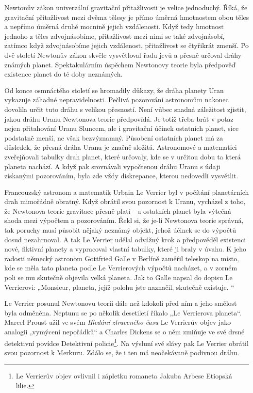   Newtonův zákon univerzální gravitační přitažlivosti je velice jednoduchý. Říká, že gravitační
  přitažlivost mezi dvěma tělesy je přímo úměrná hmotnostem obou těles a nepřímo úměrná druhé
  mocnině jejich vzdálenosti. Když tedy hmotnost jednoho z těles zdvojnásobíme, přitažlivost mezi
  nimi se také zdvojnásobí, zatímco když zdvojnásobíme jejich vzdálenost, přitažlivost se čtyřikrát
  zmenší. Po dvě století Newtonův zákon skvěle vysvětloval řadu jevů a přesně určoval dráhy známých
  planet. Spektakulárním úspěchem Newtonovy teorie byla předpověď existence planet do té doby
  neznámých. 
  
  Od konce osmnáctého století se hromadily důkazy, že dráha planety Uran vykazuje záhadné
  nepravidelnosti. Pečlivá pozorování astronomům nakonec dovolila určit tuto dráhu s velikou
  přesností. Není vůbec snadná záležitost zjistit, jakou dráhu Uranu Newtonova teorie předpovídá. Je
  totiž třeba brát v potaz nejen přitahování Uranu Sluncem, ale i gravitační účinek ostatních
  planet, sice podstatně menší, ne však bezvýznamný. Působení ostatních planet má za důsledek, že
  přesná dráha Uranu je značně složitá. Astronomové a matematici zveřejňovali tabulky drah planet,
  které určovaly, kde se v určitou dobu ta která planeta nachází. A když pak srovnávali vypočtenou
  dráhu Uranu s údaji získanými pozorováním, byla zde vždy diskrepance, kterou nedovedli vysvětlit.
  
  Francouzský astronom a matematik Urbain Le Verrier byl v počítání planetárních drah mimořádně
  obratný. Když obrátil svou pozornost k Uranu, vycházel z toho, že Newtonova teorie gravitace
  přesně platí - u ostatních planet byla výtečná shoda mezi výpočtem a pozorováním. Řekl si, že
  je-li Newtonova teorie správná, tak poruchy musí působit nějaký neznámý objekt, jehož účinek se do
  výpočtů dosud nezahrnoval. A tak Le Verrier udělal odvážný krok a předpověděl existenci nové,
  fiktivní planety a vypracoval vlastní tabulky, které ji braly v úvahu. K jeho radosti německý
  astronom Gottfried Galle v Berlíně zaměřil teleskop na místo, kde se měla tato planeta podle Le
  Verrierových výpočtů nacházet, a v zorném poli se mu skutečně objevila velká planeta. Jak to Galle
  napsal do dopisu Le Verrierovi: „Monsieur, planeta, jejíž polohu jste naznačil, skutečně existuje.
  “
  
  Le Verrier posunul Newtonovu teorii dále než kdokoli před ním a jeho smělost byla odměněna.
  Neptunu se po několik desetiletí říkalo „Le Verrierova planeta“. Marcel Proust užil ve svém
  \emph{Hledání ztraceného času} Le Verrierův objev jako analogii „vymýcení nepořádků“ a Charles
  Dickens se o něm zmiňuje ve své drsné detektivní povídce Detektivní policie\footnote{Le Verrierův
  objev ovlivnil i zápletku romaneta Jakuba Arbese Etiopská lilie.}. Na výsluní své slávy pak Le
  Verrier obrátil svou pozornost k Merkuru. Zdálo se, že i ten má neočekávaně podivnou dráhu. 
  
